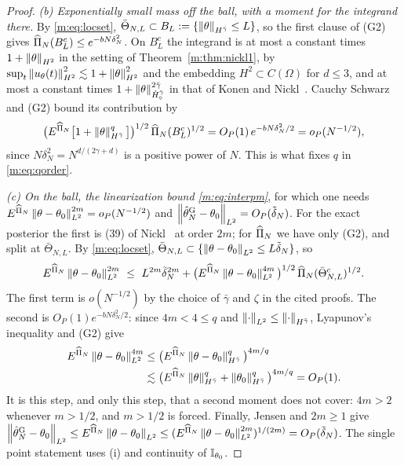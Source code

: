 \begin{proof}
\emph{(b) Exponentially small mass off the ball, with a moment for the integrand there.} By \eqref{m:eq:locset}, $\bar\Theta_{N,L}\subset B_L:=\{\left\|\theta\right\|_{H^{\bar\gamma}}\le L\}$, so the first clause of (G2) gives $\widehat\Pi_N(B^c_L)\le e^{-bN\delta_N^2}$. On $B^c_L$ the integrand is at most a constant times $1+\left\|\theta\right\|_{H^2}$ in the setting of Theorem~\ref{m:thm:nickl1}, by $\sup_t\left\|u_\theta(t)\right\|^2_{H^2}\lesssim1+\left\|\theta\right\|^2_{H^2}$ and the embedding $H^2\subset C(\Omega)$ for $d\le3$, and at most a constant times $1+\left\|\theta\right\|^{2\bar\gamma}_{\dot H^{\bar\gamma}_\diamond}$ in that of Konen and Nickl~\cite{konennickl2026}. Cauchy Schwarz and (G2) bound its contribution by
\[
\big(E^{\widehat\Pi_N}\big[1+\left\|\theta\right\|^{q}_{H^{\bar\gamma}}\big]\big)^{1/2}\,\widehat\Pi_N(B^c_L)^{1/2}=O_P(1)\,e^{-bN\delta_N^2/2}=o_P(N^{-1/2}),
\]
since $N\delta_N^2=N^{d/(2\gamma+d)}$ is a positive power of $N$. This is what fixes $q$ in \eqref{m:eq:qorder}.

\emph{(c) On the ball, the linearization bound \eqref{m:eq:interpm}}, for which one needs $E^{\widehat\Pi_N}\left\|\theta-\theta_0\right\|^{2m}_{L^2}=o_P(N^{-1/2})$ and $\left\|\hat\theta^{\rm G}_N-\theta_0\right\|_{L^2}=O_P(\tilde\delta_N)$. For the exact posterior the first is (39) of Nickl~\cite{nicklbvm2024} at order $2m$; for $\widehat\Pi_N$ we have only (G2), and split at $\bar\Theta_{N,L}$. By \eqref{m:eq:locset}, $\bar\Theta_{N,L}\subset\{\left\|\theta-\theta_0\right\|_{L^2}\le L\tilde\delta_N\}$, so
\[
E^{\Pihat}\norm{\theta-\theta_0}^{2m}_{L^2}\ \le\ L^{2m}\tilde\delta_N^{2m}+\big(E^{\Pihat}\norm{\theta-\theta_0}^{4m}_{L^2}\big)^{1/2}\,\Pihat(\bar\Theta^c_{N,L})^{1/2} .
\]
The first term is $o(N^{-1/2})$ by the choice of $\bar\gamma$ and $\zeta$ in the cited proofs. The second is $O_P(1)e^{-bN\delta_N^2/2}$: since $4m<4\le q$ and $\left\|\cdot\right\|_{L^2}\le\left\|\cdot\right\|_{H^{\bar\gamma}}$, Lyapunov's inequality and (G2) give
\[
\begin{aligned}
E^{\widehat\Pi_N}\left\|\theta-\theta_0\right\|^{4m}_{L^2}&\le\big(E^{\widehat\Pi_N}\left\|\theta-\theta_0\right\|^{q}_{H^{\bar\gamma}}\big)^{4m/q}\\
&\lesssim\big(E^{\widehat\Pi_N}\left\|\theta\right\|^{q}_{H^{\bar\gamma}}+\left\|\theta_0\right\|^{q}_{H^{\bar\gamma}}\big)^{4m/q}=O_P(1) .
\end{aligned}
\]
It is this step, and only this step, that a second moment does not cover: $4m>2$ whenever $m>1/2$, and $m>1/2$ is forced. Finally, Jensen and $2m\ge1$ give $\left\|\hat\theta^{\rm G}_N-\theta_0\right\|_{L^2}\le E^{\widehat\Pi_N}\left\|\theta-\theta_0\right\|_{L^2}\le(E^{\widehat\Pi_N}\left\|\theta-\theta_0\right\|^{2m}_{L^2})^{1/(2m)}=O_P(\tilde\delta_N)$. The single point statement uses (i) and continuity of $\mathbb{I}_{\theta_0}$.


\end{proof}

